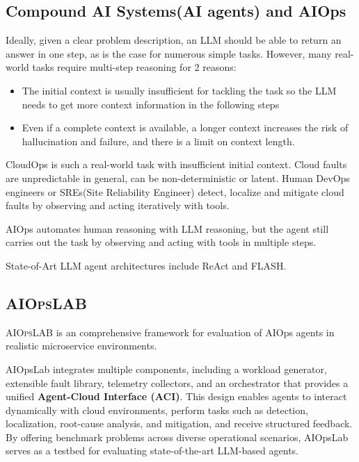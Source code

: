 \documentclass[conference]{IEEEtran}
\begin{document}
\subsection{Compound AI Systems(AI agents) and AIOps}
Ideally, given a clear problem description, an LLM should be able to return an answer in one step, as is the case for numerous simple tasks. However, many real-world tasks require multi-step reasoning for 2 reasons: 
        \begin{itemize}
                \item The initial context is usually insufficient for tackling the task so the LLM needs to get more context information in the following steps  
                \item Even if a complete context is available, a longer context increases the risk of hallucination and failure, and there is a limit on context length.
        \end{itemize}

        CloudOps is such a real-world task with insufficient initial context. Cloud faults are unpredictable in general, can be non-deterministic or latent. Human DevOps engineers or SREs(Site Reliability Engineer) detect, localize and mitigate cloud faults by observing and acting iteratively with tools. 

        AIOps automates human reasoning with LLM reasoning, but the agent still carries out the task by observing and acting with tools in multiple steps.     

        State-of-Art LLM agent architectures include ReAct\cite{yao2023reactsynergizingreasoningacting} and FLASH\cite{zhang2024flash}.

\subsection{\textsc{AIOps}LAB}
\textsc{AIOps}LAB\cite{chen2025aiopslab} is an comprehensive framework for evaluation of AIOps agents in realistic microservice environments.  

AIOpsLab integrates multiple components, including a workload generator, extensible fault library, telemetry collectors, and an orchestrator that provides a unified \textbf{Agent-Cloud Interface (ACI)}. This design enables agents to interact dynamically with cloud environments, perform tasks such as detection, localization, root-cause analysis, and mitigation, and receive structured feedback. By offering benchmark problems across diverse operational scenarios, AIOpsLab serves as a testbed for evaluating state-of-the-art LLM-based agents.
\end{document}
